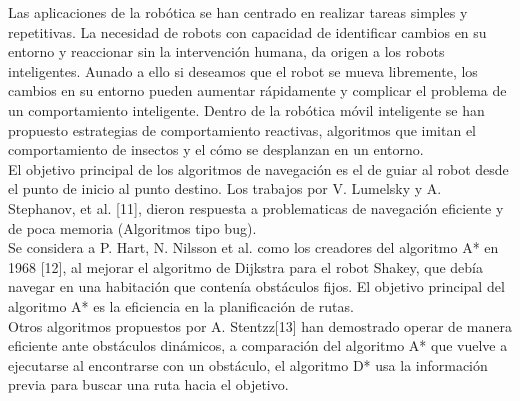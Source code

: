 \documentclass[11pt,epsf,times]{article}
\begin{document}





\vspace{1cm}

Las aplicaciones de la rob\'{o}tica se han centrado en realizar tareas simples y repetitivas. La necesidad de robots con capacidad de identificar cambios en su entorno y reaccionar sin la intervenci\'{o}n humana, da origen a los robots inteligentes. Aunado a ello si deseamos que el robot se mueva libremente, los cambios en su entorno pueden aumentar r\'{a}pidamente y complicar el problema de un comportamiento inteligente. Dentro de la rob\'{o}tica m\'{o}vil inteligente se han propuesto estrategias de comportamiento reactivas, algoritmos que imitan el comportamiento de insectos y el c\'{o}mo se desplanzan en un entorno.\\
El objetivo principal de los algoritmos de navegaci\'{o}n es el de guiar al robot desde el punto de inicio al punto destino. Los trabajos por V. Lumelsky y A. Stephanov, et al. [11], dieron respuesta a problematicas de navegaci\'{o}n eficiente y de poca memoria (Algoritmos tipo bug).\\
Se considera a P. Hart, N. Nilsson et al. como los creadores del algoritmo A* en 1968 [12], al mejorar el algoritmo de Dijkstra para el robot Shakey, que deb\'{i}a navegar en una habitaci\'{o}n que conten\'{i}a obst\'{a}culos fijos. El objetivo principal del algoritmo A* es la eficiencia en la planificaci\'{o}n de rutas.\\
Otros algoritmos propuestos por A. Stentzz[13] han demostrado operar de manera eficiente ante obst\'{a}culos din\'{a}micos, a comparaci\'{o}n del algoritmo A* que vuelve a ejecutarse al encontrarse con un obst\'{a}culo, el algoritmo D* usa la informaci\'{o}n previa para buscar una ruta hacia el objetivo.\\
\end{document}
